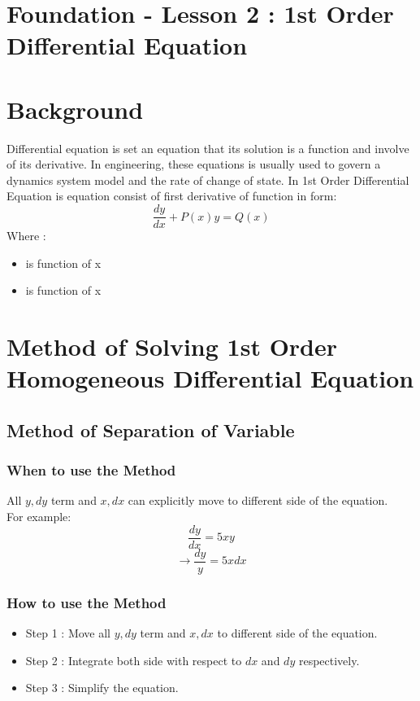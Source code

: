 \documentclass[12pt,a4paper]{article}
\begin{document}
	\section*{\centering Foundation - Lesson 2 : 1st Order Differential Equation}
	
	\section{Background}
	Differential equation is set an equation that its solution is a function and involve of its derivative. In engineering, these equations is usually used to govern a dynamics system model and the rate of change of state. In 1st Order Differential Equation is equation consist of first derivative of function in form:
	\[
	\frac{dy}{dx} + P(x)y = Q(x)
	\]
	Where :
	\begin{itemize}
		\item { is function of x}
		\item { is function of x}
	\end{itemize}
	\section{Method of Solving 1st Order Homogeneous Differential Equation}
	\subsection{Method of Separation of Variable}
	\subsubsection{When to use the Method}
	All ${y,dy}$ term and ${x,dx}$ can explicitly move to different side of the equation.\\
	For example:
	\[
	\frac{dy}{dx} = 5xy
	\]
	\[
	\rightarrow \frac{dy}{y} = 5xdx
	\]
	\subsubsection{How to use the Method}
	\begin{itemize}
		\item Step 1 : Move all ${y,dy}$ term and ${x,dx}$ to different side of the equation.
		\item Step 2 : Integrate both side with respect to $ dx $ and $ dy $ respectively.
		\item Step 3 : Simplify the equation.
	\end{itemize}
\end{document}
